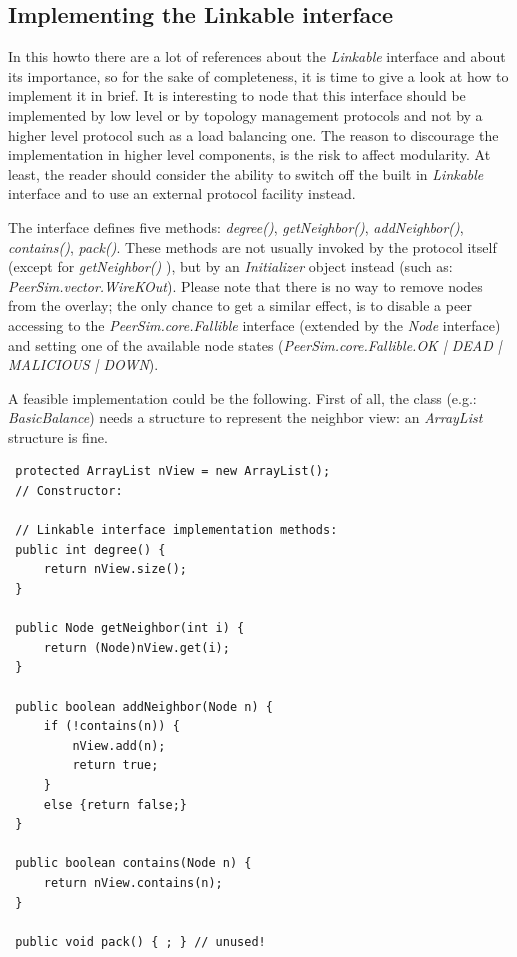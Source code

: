 \documentclass[a4paper,11pt]{article}
\begin{document}
\subsection{Implementing the Linkable interface}

In this howto there are a lot of references about the \emph{Linkable}
interface and about its importance, so for the sake of completeness,
it is time to give a look at how to implement it in brief. It is interesting
to node that this interface should be implemented by low level or
by topology management protocols and not by a higher level protocol
such as a load balancing one. The reason to discourage the
implementation in higher level components,
is the risk to affect modularity. At least, the reader should consider
the ability to switch off the built in \emph{Linkable} interface and
to use an external protocol facility instead.

The interface defines five methods: \emph{degree()}, \emph{getNeighbor()},
\emph{addNeighbor()}, \emph{contains()}, \emph{pack()}. These methods
are not usually invoked by the protocol itself (except for \emph{getNeighbor()}
), but by an \emph{Initializer} object instead (such as: 
\emph{PeerSim.vector.WireKOut}).
Please note that there
is no way to remove nodes from the overlay; the only chance to get
a similar effect, is to disable a peer accessing to the \emph{PeerSim.core.Fallible}
interface (extended by the \emph{Node} interface) and setting one
of the available node states (\emph{PeerSim.core.Fallible.OK | DEAD | 
MALICIOUS | DOWN}). 

A feasible implementation could be the following. First of all, the
class (e.g.: \emph{BasicBalance}) needs a structure to represent the
neighbor view: an \emph{ArrayList} structure is fine.

\footnotesize
\begin{verbatim}
 protected ArrayList nView = new ArrayList();
 // Constructor:
 
 // Linkable interface implementation methods:
 public int degree() {
     return nView.size();
 }
 
 public Node getNeighbor(int i) {
     return (Node)nView.get(i);
 } 
 
 public boolean addNeighbor(Node n) {
     if (!contains(n)) {
         nView.add(n);
         return true;
     }
     else {return false;}
 }
 
 public boolean contains(Node n) {
     return nView.contains(n);
 }
 
 public void pack() { ; } // unused!
\end{verbatim}
\normalsize
\end{document}
